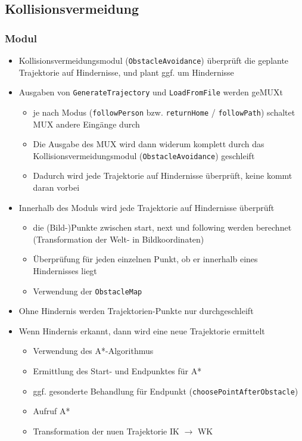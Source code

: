 \subsection{Kollisionsvermeidung}
\label{kollisionsvermeidung_subsec}

\subsubsection{Modul}
\authorsection{\editortobias}

\begin{itemize}
 
  \item Kollisionsvermeidungsmodul (\lstinline{ObstacleAvoidance}) überprüft die geplante Trajektorie auf Hindernisse, und plant ggf. um Hindernisse
  \item Ausgaben von \lstinline{GenerateTrajectory} und \lstinline{LoadFromFile} werden geMUXt
  \begin{itemize}
    \item je nach Modus (\lstinline{followPerson} bzw. \lstinline{returnHome} / \lstinline{followPath}) schaltet MUX andere Eingänge durch
  	\item Die Ausgabe des MUX wird dann widerum komplett durch das Kollisionsvermeidungsmodul (\lstinline{ObstacleAvoidance}) geschleift
    \item Dadurch wird jede Trajektorie auf Hindernisse überprüft, keine kommt \glqq daran vorbei\grqq
  \end{itemize}
  \item Innerhalb des Moduls wird jede Trajektorie auf Hindernisse überprüft
	\begin{itemize}
	  \item die (Bild-)Punkte zwischen start, next und following werden berechnet (Transformation der Welt- in Bildkoordinaten)
	  \item Überprüfung für jeden einzelnen Punkt, ob er innerhalb eines Hindernisses liegt
	  \item Verwendung der \lstinline{ObstacleMap} 
	\end{itemize}
  \item Ohne Hindernis werden Trajektorien-Punkte nur durchgeschleift
  \item Wenn Hindernis erkannt, dann wird eine neue Trajektorie ermittelt
  \begin{itemize}
    \item Verwendung des A*-Algorithmus
    \item Ermittlung des Start- und Endpunktes für A*
    \item ggf. gesonderte Behandlung für Endpunkt (\lstinline{choosePointAfterObstacle})
    \item Aufruf A*
    \item Transformation der nuen Trajektorie IK $\rightarrow$ WK
  \end{itemize}

\end{itemize}



